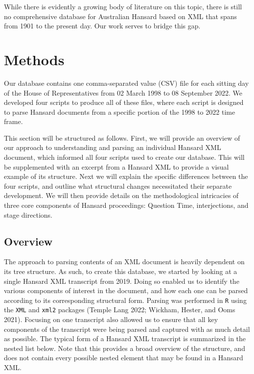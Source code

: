 \documentclass[
  letterpaper,
  DIV=11,
  numbers=noendperiod]{scrartcl}
\begin{document}
While there is evidently a growing body of literature on this topic,
there is still no comprehensive database for Australian Hansard based on
XML that spans from 1901 to the present day. Our work serves to bridge
this gap.

\hypertarget{methods}{%
\section{Methods}\label{methods}}

Our database contains one comma-separated value (CSV) file for each
sitting day of the House of Representatives from 02 March 1998 to 08
September 2022. We developed four scripts to produce all of these files,
where each script is designed to parse Hansard documents from a specific
portion of the 1998 to 2022 time frame.

This section will be structured as follows. First, we will provide an
overview of our approach to understanding and parsing an individual
Hansard XML document, which informed all four scripts used to create our
database. This will be supplemented with an excerpt from a Hansard XML
to provide a visual example of its structure. Next we will explain the
specific differences between the four scripts, and outline what
structural changes necessitated their separate development. We will then
provide details on the methodological intricacies of three core
components of Hansard proceedings: Question Time, interjections, and
stage directions.

\hypertarget{sec-overview}{%
\subsection{Overview}\label{sec-overview}}

The approach to parsing contents of an XML document is heavily dependent
on its tree structure. As such, to create this database, we started by
looking at a single Hansard XML transcript from 2019. Doing so enabled
us to identify the various components of interest in the document, and
how each one can be parsed according to its corresponding structural
form. Parsing was performed in \texttt{R} using the \texttt{XML} and
\texttt{xml2} packages (Temple Lang 2022; Wickham, Hester, and Ooms
2021). Focusing on one transcript also allowed us to ensure that all key
components of the transcript were being parsed and captured with as much
detail as possible. The typical form of a Hansard XML transcript is
summarized in the nested list below. Note that this provides a broad
overview of the structure, and does not contain every possible nested
element that may be found in a Hansard XML.
\end{document}
